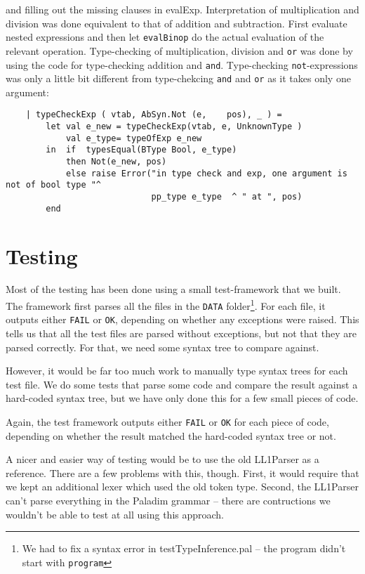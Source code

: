 \documentclass{article}
\begin{document}
and filling out the missing clauses in evalExp.
Interpretation of multiplication and division was done equivalent to that of addition and subtraction. First evaluate nested expressions and then let \texttt{evalBinop} do the actual evaluation of the relevant operation.
Type-checking of multiplication, division and \texttt{or} was done by using the code for type-checking addition and \texttt{and}. Type-checking \texttt{not}-expressions was only a little bit different from type-chekcing \texttt{and} and \texttt{or} as it takes only one argument:
\begin{verbatim}
    | typeCheckExp ( vtab, AbSyn.Not (e,    pos), _ ) =
        let val e_new = typeCheckExp(vtab, e, UnknownType )
            val e_type= typeOfExp e_new
        in  if  typesEqual(BType Bool, e_type)
            then Not(e_new, pos)
            else raise Error("in type check and exp, one argument is not of bool type "^
                             pp_type e_type  ^ " at ", pos)
        end
\end{verbatim}
\section{Testing}
Most of the testing has been done using a small test-framework that we built. The framework
first parses all the files in the \texttt{DATA} folder\footnote{We had to fix a syntax error in testTypeInference.pal -- the program didn't start with \texttt{program}}. For each file, it outputs either
\texttt{FAIL} or \texttt{OK}, depending on whether any exceptions were raised. This tells us
that all the test files are parsed without exceptions, but not that they are parsed correctly.
For that, we need some syntax tree to compare against.

However, it would be far too much work to manually type syntax trees for each test file. We do
some tests that parse some code and compare the result against a hard-coded syntax tree, but
we have only done this for a few small pieces of code.

Again, the test framework outputs either \texttt{FAIL} or \texttt{OK} for each piece of code,
depending on whether the result matched the hard-coded syntax tree or not.

A nicer and easier way of testing would be to use the old LL1Parser as a reference. There are
a few problems with this, though. First, it would require that we kept an additional lexer
which used the old token type. Second, the LL1Parser can't parse everything in the Paladim
grammar -- there are contructions we wouldn't be able to test at all using this approach.
\end{document}
